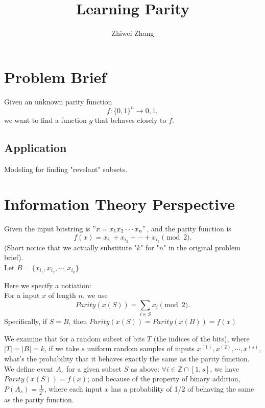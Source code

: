 \documentclass[12pt]{article}
\newenvironment{definition}[2][Definition]{\begin{trivlist}
		\item[\hskip \labelsep {\bfseries #1}\hskip \labelsep {\bfseries #2.}]}{\end{trivlist}}
\begin{document}
 
 
 
\title{Learning Parity}
\author{Zhiwei Zhang}
 
\maketitle
\section{Problem Brief}
Given an unknown parity function $$f : \{0, 1\} ^ n \to {0, 1},$$ we want to find a function $g$ that behaves closely to $f$. 

\subsection{Application}
Modeling for finding "revelant" subsets.

\section{Information Theory Perspective}
Given the input bitstring is $"x = x_1x_2 \cdots x_n"$, and the parity function is 
$$f(x) = x_{i_1} + x_{i_2} + \cdots + x_{i_k} \pmod 2 .$$
(Short notice that we actually substitute "$k$" for "$n$" in the original problem brief). \\
\newline
Let $B = \{x_{i_1} , x_{i_2} , \cdots , x_{i_k}\}$\\
\begin{definition}[Notation Definition]{}
Here we specify a notiation: \\
For a input $x$ of length $n$, we use 
$$Parity(x(S)) = \sum\limits_{i \in S}x_i \pmod 2.$$  
Specifically, if $S = B$, then $Parity(x(S)) = Parity(x(B)) = f(x)$
\end{definition}

\noindent We examine that for a random subset of bits $T$ (the indices of the bits), where $|T| = |B| = k$, if we take $s$ uniform random samples of inputs $x^{(1)}, x^{(2)}, \cdots, x^{(s)}$, what's the probability that it behaves exactly the same as the parity function.\\
\newline
We define event $A_s$ for a given subset $S$ as above: $\forall i \in \mathbb{Z} \cap [1, s]$, we have $Parity(x(S)) = f(x)$; and because of the property of binary addition, $P(A_s) = \frac{1}{2^s}$, where each input $x$ has a probability of 1/2 of behaving the same as the parity function. 
\end{document}
